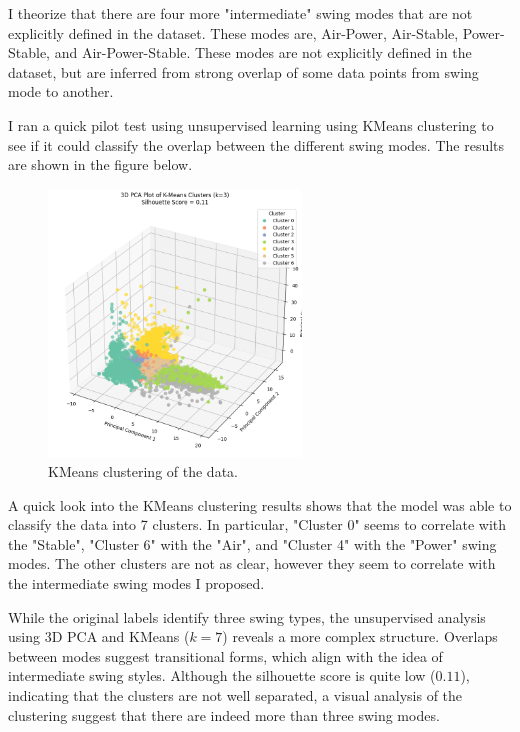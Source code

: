 \documentclass[12pt]{article}
\begin{document}
I theorize that there are four more "intermediate" swing modes that are not explicitly defined in the dataset. These modes are, Air-Power, Air-Stable, Power-Stable, and Air-Power-Stable. These modes are not explicitly defined in the dataset, but are inferred from strong overlap of some data points from swing mode to another.

I ran a quick pilot test using unsupervised learning using KMeans clustering to see if it could classify the overlap between the different swing modes. The results are shown in the figure below.

\begin{figure}[h!]
    \centering
    \includegraphics[width=0.6\textwidth]{3d_pca_kmean_clustering.png}
    \caption{KMeans clustering of the data.}
    \label{fig:kmeans}
\end{figure}

A quick look into the KMeans clustering results shows that the model was able to classify the data into 7 clusters. In particular, "Cluster 0" seems to correlate with the "Stable", "Cluster 6" with the "Air", and "Cluster 4" with the "Power" swing modes. 
The other clusters are not as clear, however they seem to correlate with the intermediate swing modes I proposed. 

While the original labels identify three swing types, the unsupervised analysis using 3D PCA and KMeans ($k=7$) reveals a more complex structure. Overlaps between modes suggest transitional forms, which align with the idea of intermediate swing styles. 
Although the silhouette score is quite low ($0.11$), indicating that the clusters are not well separated, a visual analysis of the clustering suggest that there are indeed more than three swing modes.
\end{document}
